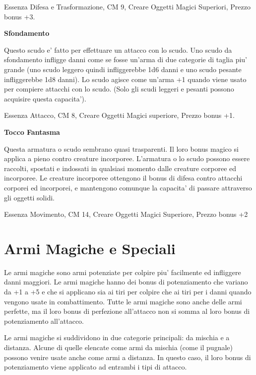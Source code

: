 \documentclass[a4paper,11pt,twoside,openany]{book}
\begin{document}
{		Essenza Difesa e Trasformazione, CM 9, Creare Oggetti Magici Superiori, Prezzo bonus +3.
		
		\textbf{Sfondamento}
		
		Questo scudo e' fatto per effettuare un attacco con lo scudo. Uno scudo da sfondamento infligge danni come se fosse un'arma di due categorie di taglia piu' grande (uno scudo leggero quindi infliggerebbe 1d6 danni e uno scudo pesante infliggerebbe 1d8 danni). Lo scudo agisce come un'arma +1 quando viene usato per compiere attacchi con lo scudo. (Solo gli scudi leggeri e pesanti possono acquisire questa capacita').
		
		Essenza Attacco, CM 8, Creare Oggetti Magici superiore, Prezzo bonus +1.
		
		\textbf{Tocco Fantasma}
		
		Questa armatura o scudo sembrano quasi trasparenti. Il loro bonus magico si applica a pieno contro creature incorporee. L'armatura o lo scudo possono essere raccolti, spostati e indossati in qualsiasi momento dalle creature corporee ed incorporee. Le creature incorporee ottengono il bonus di difesa contro attacchi corporei ed incorporei, e mantengono comunque la capacita' di passare attraverso gli oggetti solidi.
		
		Essenza Movimento, CM 14, Creare Oggetti Magici Superiore, Prezzo bonus +2
		
		\pagebreak
		
		\section{Armi Magiche e Speciali}
		
		\label{armi-magiche-e-speciali}
		
		Le armi magiche sono armi potenziate per colpire piu' facilmente ed infliggere danni maggiori. Le armi magiche hanno dei bonus di potenziamento che variano da +1 a +5 e che si applicano sia ai tiri per colpire che ai tiri per i danni quando vengono usate in combattimento. Tutte le armi magiche sono anche delle armi perfette, ma il loro bonus di perfezione all'attacco non si somma al loro bonus di potenziamento all'attacco.
		
		Le armi magiche si suddividono in due categorie principali: da mischia e a distanza. Alcune di quelle elencate come armi da mischia (come il pugnale) possono venire usate anche come armi a distanza. In questo caso, il loro bonus di potenziamento viene applicato ad entrambi i tipi di attacco.
		
}
\end{document}
